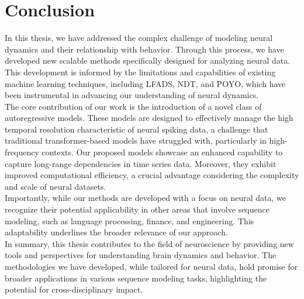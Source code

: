 \chapter{Conclusion}\label{ch:conclusion}

In this thesis, we have addressed the complex challenge of modeling neural dynamics and their relationship with behavior. Through this process, we have developed new scalable methods specifically designed for analyzing neural data. This development is informed by the limitations and capabilities of existing machine learning techniques, including LFADS, NDT, and POYO, which have been instrumental in advancing our understanding of neural dynamics.
\\

The core contribution of our work is the introduction of a novel class of autoregressive models. These models are designed to effectively manage the high temporal resolution characteristic of neural spiking data, a challenge that traditional transformer-based models have struggled with, particularly in high-frequency contexts. Our proposed models showcase an enhanced capability to capture long-range dependencies in time series data. Moreover, they exhibit improved computational efficiency, a crucial advantage considering the complexity and scale of neural datasets.
\\

Importantly, while our methods are developed with a focus on neural data, we recognize their potential applicability in other areas that involve sequence modeling, such as language processing, finance, and engineering. This adaptability underlines the broader relevance of our approach.
\\

In summary, this thesis contributes to the field of neuroscience by providing new tools and perspectives for understanding brain dynamics and behavior. The methodologies we have developed, while tailored for neural data, hold promise for broader applications in various sequence modeling tasks, highlighting the potential for cross-disciplinary impact.